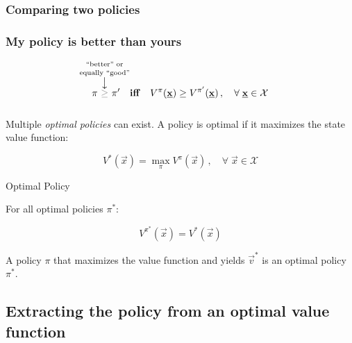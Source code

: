 \subsubsection{Comparing two policies}

\begin{frame}\frametitle{My policy is better than yours}


\begin{equation}
\pi~
\overset{\mathclap{\substack{%
					\text{``better'' or}\\[1mm]\text{equally ``good''}\\ \big\downarrow
					}}}{{\color{gray}\ge}}
~\pi' 
\quad \text{\textbf{iff}} \quad V^{\pi} (\vec x) \ge V^{\pi'} (\vec x)\,,\quad \forall\; \vec x \in \mathcal{X}
\end{equation}

\end{frame}

\begin{frame}\frametitle{\subsecname}

Multiple \emph{optimal policies} can exist. A policy is optimal if it maximizes the state value function:

\begin{equation}
V^{*}(\vec x) = \max_{\pi} V^{\pi} (\vec x)\,,\quad \forall\; \vec x \in \mathcal{X}
\end{equation}

\begin{block}{Optimal Policy}

For all optimal policies $\pi^{*}$:

\begin{equation}
    V^{\pi^{*}}(\vec x) = V^{*}(\vec x) 
\end{equation}

A policy $\pi$ that maximizes the value function and yields $\vec v^{*}$ is an optimal policy $\pi^{*}$.
    
\end{block}

    
\end{frame}

\subsection{Extracting the policy from an optimal value function}

